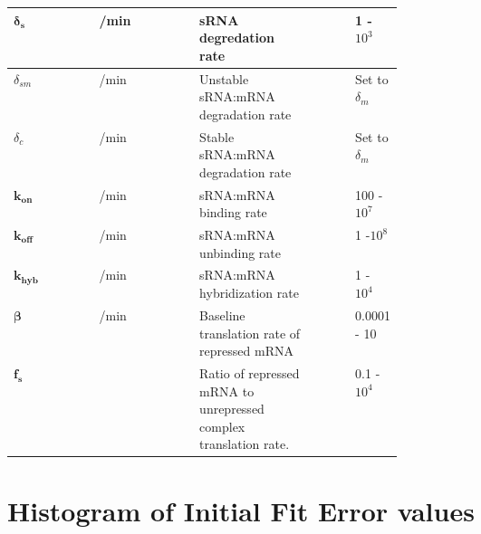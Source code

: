 \documentclass[10pt,journal]{./IEEE_latex_class/IEEEtran}
\begin{document}
\begin{table}[h!]
\begin{tabular}{| l | l | p{0.3\linewidth} | p{0.1\linewidth} | p{0.1\linewidth} |}
\hline $\boldsymbol{\delta_{s}}$ &  /min & sRNA degredation rate & & 1 - $10^3$ \\
\hline $\delta_{sm}$ &  /min & Unstable sRNA:mRNA degradation rate & &  Set to $\delta_m$\\
\hline $\delta_{c}$ &  /min & Stable sRNA:mRNA degradation rate & & Set to $\delta_m$ \\
\hline $\boldsymbol{k_{on}}$ &   /min & sRNA:mRNA binding rate & & 100 - $10^7$\\
\hline $\boldsymbol{k_{off}}$ &  /min & sRNA:mRNA unbinding rate & & 1 -$10^8$\\
\hline $\boldsymbol{k_{hyb}}$ &  /min & sRNA:mRNA hybridization rate & & 1 - $10^4$ \\
\hline $\boldsymbol{\beta}$ &   /min & Baseline translation rate of repressed mRNA & & 0.0001 - 10\\
\hline $\boldsymbol{f_{s}}$ & & Ratio of repressed mRNA to unrepressed complex translation rate. & & 0.1 - $10^4$\\
\hline
\end{tabular}
\end{table}

\clearpage

\section{Histogram of Initial Fit Error values}
\label{Initial fit Error}
\setcounter{figure}{0}    
\end{document}
